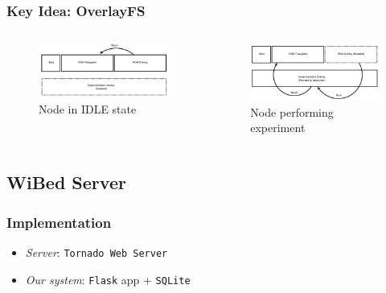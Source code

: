 \documentclass[usepdftitle=false,13pt]{beamer}
\begin{document}
\begin{frame}\frametitle{Key Idea: OverlayFS}


\begin{columns}[c] %
		\begin{figure}[h!]
		\begin{center}
		\includegraphics[width=1.0\textwidth]{pic/firmfs2}
		\caption{Node in IDLE state}
		\label{fig:wmn}
		\end{center}
		\end{figure}
  		\begin{figure}[h!]
		\begin{center}
		\includegraphics[width=1.0\textwidth]{pic/firmfs3}
		\caption{Node performing experiment}
		\label{fig:wmn}
		\end{center}
		\end{figure}  
   	\end{columns}

\end{frame}

\subsection{WiBed Server}

\begin{frame}\frametitle{Implementation}

	\begin{itemize}
		\item \textit{Server}:  \texttt{Tornado Web Server}
		\item \textit{Our system}: \texttt{Flask} app + \texttt{SQLite}
	\end{itemize}

\end{frame}
\end{document}
